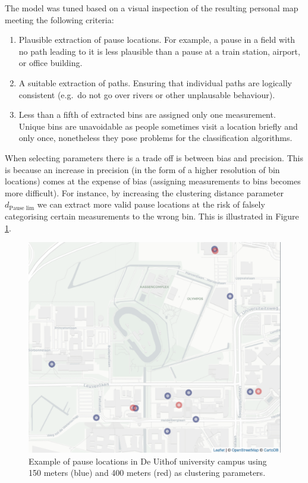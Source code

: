 \documentclass[man]{apa6}
\providecommand{\tightlist}{%
  \setlength{\itemsep}{0pt}\setlength{\parskip}{0pt}}
\theoremstyle{definition}
\theoremstyle{definition}
\theoremstyle{definition}
\theoremstyle{remark}
\begin{document}
The model was tuned based on a visual inspection of the resulting
personal map meeting the following criteria:

\begin{enumerate}
\def\labelenumi{\arabic{enumi}.}
\tightlist
\item
  Plausible extraction of pause locations. For example, a pause in a
  field with no path leading to it is less plausible than a pause at a
  train station, airport, or office building.
\item
  A suitable extraction of paths. Ensuring that individual paths are
  logically consistent (e.g.~do not go over rivers or other unplausable
  behaviour).
\item
  Less than a fifth of extracted bins are assigned only one measurement.
  Unique bins are unavoidable as people sometimes visit a location
  briefly and only once, nonetheless they pose problems for the
  classification algorithms.
\end{enumerate}

When selecting parameters there is a trade off is between bias and
precision. This is because an increase in precision (in the form of a
higher resolution of bin locations) comes at the expense of bias
(assigning measurements to bins becomes more difficult). For instance,
by increasing the clustering distance parameter \(d_{\text{Pause lim}}\)
we can extract more valid pause locations at the risk of falsely
categorising certain measurements to the wrong bin. This is illustrated
in Figure \ref{fig:pauseLocUithof1}.

\begin{figure}
\includegraphics[width=1\linewidth]{img/distanceParam} \caption{Example of pause locations in De Uithof university campus using 150 meters (blue) and 400 meters (red) as clustering parameters.}\label{fig:pauseLocUithof1}
\end{figure}
\end{document}
